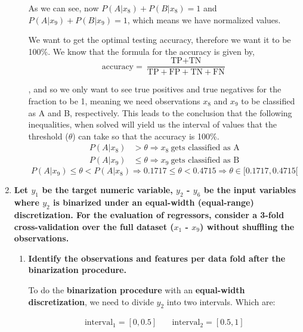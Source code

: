 \documentclass[12pt]{article}
\begin{document}
\begin{enumerate}[leftmargin=\labelsep]
\begin{enumerate}
          As we can see, now $P(A | x_8) + P(B | x_8) = 1$ and $P(A | x_9) + P(B | x_9) = 1$, which means we have normalized values.

          We want to get the optimal testing accuracy, therefore we want it to be 100\%. We know that the formula for the accuracy is given by,
          $$
            \text{accuracy} = \frac{\text{TP} + \text{TN}}{\text{TP} + \text{FP} + \text{TN} + \text{FN}}
          $$

          , and so we only want to see true positives and true negatives for the fraction to be 1, meaning we need observations $x_8$ and $x_9$ to be classified as A and B, respectively.
          This leads to the conclusion that the following inequalities, when solved will yield us the interval of values that the threshold ($\theta$) can take so that the accuracy is 100\%.
          \[
              \begin{aligned}
                  P(A|x_8) & > \theta \Rightarrow x_8 \ \text{gets classified as A}\\
                  P(A|x_9) & \leq \theta \Rightarrow x_9 \ \text{gets classified as B}
              \end{aligned}
          \]
          \begin{equation}
              P(A | x_9) \leq \theta < P(A | x_8) \Rightarrow 0.1717 \leq \theta < 0.4715 \Rightarrow \theta \in [0.1717, 0.4715[
          \end{equation}

          \end{enumerate}

    \item \textbf{Let $y_1$ be the target numeric variable, $y_2$ - $y_6$ be the input variables where $y_2$ is binarized under an
          equal-width (equal-range) discretization. For the evaluation of regressors, consider a 3-fold
          cross-validation over the full dataset ($x_1$ - $x_9$) without shuffling the observations.}
          \begin{enumerate}
          \item \textbf{Identify the observations and features per data fold after the binarization procedure.}

          \vskip 0.3cm
          To do the \textbf{binarization procedure} with an \textbf{equal-width discretization}, we need to divide $y_2$ into two intervals. Which are:

          \[
              \begin{array}{cc}
                  \text{interval}_1 = [0, 0.5] &\quad
                  \text{interval}_2 = [0.5, 1]
              \end{array}
          \]


\end{enumerate}
\end{enumerate}
\end{document}
